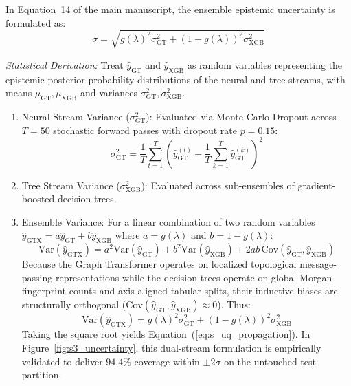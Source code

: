 \documentclass[11pt]{article}
\begin{document}
In Equation~14 of the main manuscript, the ensemble epistemic uncertainty is formulated as:
\begin{equation}
\sigma = \sqrt{g(\lambda)^2 \sigma_{\mathrm{GT}}^2 + \left(1 - g(\lambda)\right)^2 \sigma_{\mathrm{XGB}}^2}
\label{eq:s_uq_propagation}
\end{equation}

\noindent\textit{Statistical Derivation:} Treat $\hat{y}_{\mathrm{GT}}$ and $\hat{y}_{\mathrm{XGB}}$ as random variables representing the epistemic posterior probability distributions of the neural and tree streams, with means $\mu_{\mathrm{GT}}, \mu_{\mathrm{XGB}}$ and variances $\sigma_{\mathrm{GT}}^2, \sigma_{\mathrm{XGB}}^2$. 
\begin{enumerate}[leftmargin=1.0cm]
    \item Neural Stream Variance ($\sigma_{\mathrm{GT}}^2$): Evaluated via Monte Carlo Dropout across $T = 50$ stochastic forward passes with dropout rate $p = 0.15$:
    \begin{equation}
    \sigma_{\mathrm{GT}}^2 = \frac{1}{T} \sum_{t=1}^T \left( \hat{y}_{\mathrm{GT}}^{(t)} - \frac{1}{T}\sum_{k=1}^T \hat{y}_{\mathrm{GT}}^{(k)} \right)^2
    \label{eq:s_mc_dropout}
    \end{equation}
    \item Tree Stream Variance ($\sigma_{\mathrm{XGB}}^2$): Evaluated across sub-ensembles of gradient-boosted decision trees.
    \item Ensemble Variance: For a linear combination of two random variables $\hat{y}_{\mathrm{GTX}} = a \hat{y}_{\mathrm{GT}} + b \hat{y}_{\mathrm{XGB}}$ where $a = g(\lambda)$ and $b = 1 - g(\lambda)$:
    \begin{equation}
    \mathrm{Var}(\hat{y}_{\mathrm{GTX}}) = a^2 \mathrm{Var}(\hat{y}_{\mathrm{GT}}) + b^2 \mathrm{Var}(\hat{y}_{\mathrm{XGB}}) + 2ab \, \mathrm{Cov}(\hat{y}_{\mathrm{GT}}, \hat{y}_{\mathrm{XGB}})
    \label{eq:s_var_expansion}
    \end{equation}
    Because the Graph Transformer operates on localized topological message-passing representations while the decision trees operate on global Morgan fingerprint counts and axis-aligned tabular splits, their inductive biases are structurally orthogonal ($\mathrm{Cov}(\hat{y}_{\mathrm{GT}}, \hat{y}_{\mathrm{XGB}}) \approx 0$). Thus:
    \begin{equation}
    \mathrm{Var}(\hat{y}_{\mathrm{GTX}}) = g(\lambda)^2 \sigma_{\mathrm{GT}}^2 + (1 - g(\lambda))^2 \sigma_{\mathrm{XGB}}^2
    \end{equation}
    Taking the square root yields Equation~(\ref{eq:s_uq_propagation}). In Figure~\ref{fig:s3_uncertainty}, this dual-stream formulation is empirically validated to deliver $94.4\%$ coverage within $\pm 2\sigma$ on the untouched test partition.
\end{enumerate}
\end{document}
